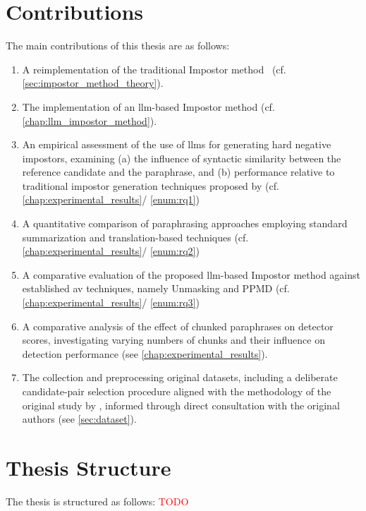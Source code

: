 


\section{Contributions}
\label{sec:contributions}
The main contributions of this thesis are as follows:
\begin{enumerate}
    \item A reimplementation of the traditional Impostor method~\citep{koppel_determining_2014} (cf. \autoref{sec:impostor_method_theory}).
    \item The implementation of an \ac{llm}-based Impostor method (cf. \autoref{chap:llm_impostor_method}). 
    \item An empirical assessment of the use of \acp{llm} for generating hard negative impostors, examining (a) the influence of syntactic similarity between the reference candidate and the paraphrase, and (b) performance relative to traditional impostor generation techniques proposed by \citet{koppel_determining_2014} (cf. \autoref{chap:experimental_results}/ \ref{enum:rq1})
    \item A quantitative comparison of paraphrasing approaches employing standard summarization and translation-based techniques (cf. \autoref{chap:experimental_results}/ \ref{enum:rq2})
    \item A comparative evaluation of the proposed \ac{llm}-based Impostor method against established \ac{av} techniques, namely Unmasking and PPMD (cf. \autoref{chap:experimental_results}/ \ref{enum:rq3})
    \item A comparative analysis of the effect of chunked paraphrases on detector scores, investigating varying numbers of chunks and their influence on detection performance (see \autoref{chap:experimental_results}).
    \item The collection and preprocessing original datasets, including a deliberate candidate-pair selection procedure aligned with the methodology of the original study by \citet{koppel_determining_2014}, informed through direct consultation with the original authors (see \autoref{sec:dataset}).
\end{enumerate}


\section{Thesis Structure}
\label{sec:thesis_structure}
The thesis is structured as follows:
\textcolor{red}{TODO}